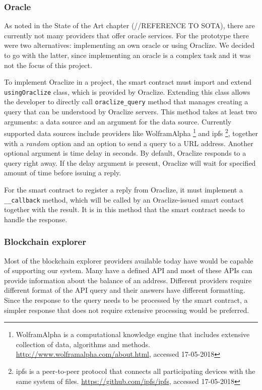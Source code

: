 \subsubsection{Oracle}
As noted in the State of the Art chapter (//REFERENCE TO SOTA), there are currently not many providers that offer oracle services. For the prototype there were two alternatives: implementing an own oracle or using Oraclize. We decided to go with the latter, since implementing an oracle is a complex task and it was not the focus of this project.

To implement Oraclize in a project, the smart contract must import and extend \texttt{usingOraclize} class, which is provided by Oraclize. Extending this class allows the developer to directly call \texttt{oraclize\_query} method that manages creating a query that can be understood by Oraclize servers. This method takes at least two arguments: a data source and an argument for the data source. Currently supported data sources include providers like WolframAlpha%
\footnote{WolframAlpha is a computational knowledge engine that includes extensive collection of data, algorithms and methods. \url{http://www.wolframalpha.com/about.html}, accessed 17-05-2018}%
and \acrshort{ipfs}%
\footnote{\acrfull{ipfs} is a peer-to-peer protocol that connects all participating devices with the same system of files. \url{https://github.com/ipfs/ipfs}, accessed 17-05-2018},%
together with a \textit{random} option and an option to send a query to a URL address. Another optional argument is time delay in seconds. By default, Oraclize responds to a query right away. If the delay argument is present, Oraclize will wait for specified amount of time before issuing a reply.

For the smart contract to register a reply from Oraclize, it must implement a \texttt{\_\_callback} method, which will be called by an Oraclize-issued smart contact together with the result. It is in this method that the smart contract needs to handle the response.
%
% 
% 
% 
% 
\subsubsection{Blockchain explorer}
Most of the blockchain explorer providers available today have would be capable of supporting our system. Many have a defined API and most of these APIs can provide information about the balance of an address. Different providers require different format of the API query and their answers have different formatting. Since the response to the query needs to be processed by the smart contract, a simpler response that does not require extensive processing would be preferred.

